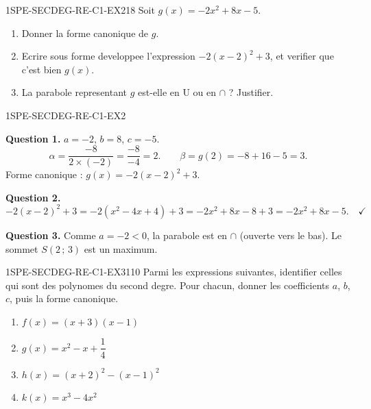 
\begin{exercice}{1SPE-SECDEG-RE-C1-EX2}{1}{8}
Soit $g(x) = -2x^2 + 8x - 5$.
\begin{enumerate}
  \item Donner la forme canonique de $g$.
  \item Ecrire sous forme developpee l'expression $-2(x - 2)^2 + 3$, et verifier que c'est bien $g(x)$.
  \item La parabole representant $g$ est-elle en U ou en $\cap$ ? Justifier.
\end{enumerate}
\end{exercice}



\begin{corrige}{1SPE-SECDEG-RE-C1-EX2}


\textbf{Question 1.} $a = -2$, $b = 8$, $c = -5$.
\[
\alpha = \frac{-8}{2 \times (-2)} = \frac{-8}{-4} = 2. \qquad \beta = g(2) = -8 + 16 - 5 = 3.
\]
Forme canonique : $g(x) = -2(x-2)^2 + 3$.

\textbf{Question 2.}
\[
-2(x-2)^2 + 3 = -2(x^2 - 4x + 4) + 3 = -2x^2 + 8x - 8 + 3 = -2x^2 + 8x - 5. \quad \checkmark
\]


\textbf{Question 3.} Comme $a = -2 < 0$, la parabole est en $\cap$ (ouverte vers le bas). Le sommet $S(2\,;\,3)$ est un maximum.

\end{corrige}


\begin{exercice}{1SPE-SECDEG-RE-C1-EX3}{1}{10}
Parmi les expressions suivantes, identifier celles qui sont des polynomes du second degre. Pour chacun, donner les coefficients $a$, $b$, $c$, puis la forme canonique.
\begin{enumerate}
  \item $f(x) = (x+3)(x-1)$
  \item $g(x) = x^2 - x + \dfrac{1}{4}$
  \item $h(x) = (x+2)^2 - (x-1)^2$
  \item $k(x) = x^3 - 4x^2$
\end{enumerate}
\end{exercice}

